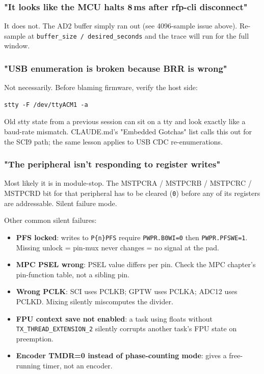 \subsubsection{"It looks like the MCU halts 8\,ms after rfp-cli disconnect"}

It does not. The AD2 buffer simply ran out (see 4096-sample issue
above). Re-sample at \texttt{buffer\_size / desired\_seconds} and
the trace will run for the full window.

\subsubsection{"USB enumeration is broken because BRR is wrong"}

Not necessarily. Before blaming firmware, verify the host side:

\begin{verbatim}
stty -F /dev/ttyACM1 -a
\end{verbatim}

Old stty state from a previous session can sit on a tty and look
exactly like a baud-rate mismatch. CLAUDE.md's "Embedded Gotchas"
list calls this out for the SCI9 path; the same lesson applies to
USB CDC re-enumerations.

\subsubsection{"The peripheral isn't responding to register writes"}

Most likely it is in module-stop. The MSTPCRA / MSTPCRB / MSTPCRC /
MSTPCRD bit for that peripheral has to be cleared (\texttt{0}) before
any of its registers are addressable. Silent failure mode.

Other common silent failures:

\begin{itemize}
  \item \textbf{PFS locked}: writes to \texttt{P\{n\}PFS} require
        \texttt{PWPR.B0WI=0} then \texttt{PWPR.PFSWE=1}. Missing
        unlock = pin-mux never changes = no signal at the pad.
  \item \textbf{MPC PSEL wrong}: PSEL value differs per pin. Check
        the MPC chapter's pin-function table, not a sibling pin.
  \item \textbf{Wrong PCLK}: SCI uses PCLKB; GPTW uses PCLKA;
        ADC12 uses PCLKD. Mixing silently miscomputes the divider.
  \item \textbf{FPU context save not enabled}: a task using floats
        without \texttt{TX\_THREAD\_EXTENSION\_2} silently corrupts
        another task's FPU state on preemption.
  \item \textbf{Encoder TMDR=0 instead of phase-counting mode}:
        gives a free-running timer, not an encoder.
\end{itemize}

